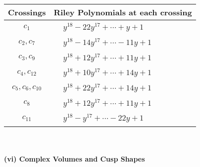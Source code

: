 \documentclass[1p]{elsarticle_modified}
\theoremstyle{definition}
\begin{document}
\begin{tabular}{m{50pt}|m{274pt}}
Crossings & \hspace{64pt}Riley Polynomials at each crossing \\
\hline $$\begin{aligned}c_{1}\end{aligned}$$&$\begin{aligned}
&y^{18}-22 y^{17}+\cdots+y+1
\end{aligned}$\\
\hline $$\begin{aligned}c_{2},c_{7}\end{aligned}$$&$\begin{aligned}
&y^{18}-14 y^{17}+\cdots-11 y+1
\end{aligned}$\\
\hline $$\begin{aligned}c_{3},c_{9}\end{aligned}$$&$\begin{aligned}
&y^{18}+12 y^{17}+\cdots+11 y+1
\end{aligned}$\\
\hline $$\begin{aligned}c_{4},c_{12}\end{aligned}$$&$\begin{aligned}
&y^{18}+10 y^{17}+\cdots+14 y+1
\end{aligned}$\\
\hline $$\begin{aligned}c_{5},c_{6},c_{10}\end{aligned}$$&$\begin{aligned}
&y^{18}+22 y^{17}+\cdots+14 y+1
\end{aligned}$\\
\hline $$\begin{aligned}c_{8}\end{aligned}$$&$\begin{aligned}
&y^{18}+12 y^{17}+\cdots+11 y+1
\end{aligned}$\\
\hline $$\begin{aligned}c_{11}\end{aligned}$$&$\begin{aligned}
&y^{18}- y^{17}+\cdots-22 y+1
\end{aligned}$\\
\hline
\end{tabular}\\~\\
\newpage\flushleft \textbf{(vi) Complex Volumes and Cusp Shapes}
\end{document}
